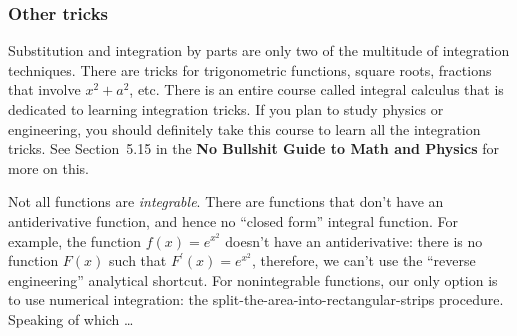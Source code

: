



		\subsubsection{Other tricks}

			Substitution and integration by parts
			are only two of the multitude of integration techniques.			
			There are tricks for trigonometric functions, square roots,
			fractions that involve $x^2 + a^2$, etc.
			There is an entire course called integral calculus
			that is dedicated to learning integration tricks.
			If you plan to study physics or engineering,
			you should definitely take this course to learn all the integration tricks.
			See Section~5.15 in the \textbf{No Bullshit Guide to Math and Physics}
			for more on this.

			Not all functions are \emph{integrable}.
			There are functions that don't have an antiderivative function,
			and hence no ``closed form'' integral function.
			For example,
			the function $f(x) = e^{x^2}$ doesn't have an antiderivative:
			there is no function $F(x)$ such that $F^{\prime\!}(x) = e^{x^2}$,
			therefore,
			we can't use the ``reverse engineering'' analytical shortcut.
			For nonintegrable functions,
			our only option is to use numerical integration:
			the split-the-area-into-rectangular-strips procedure.
			Speaking of which \ldots
			









